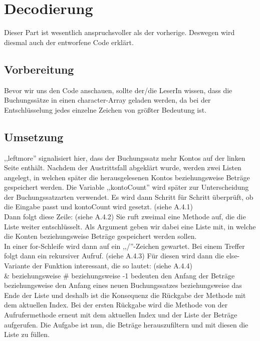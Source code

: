 \documentclass[12pt]{report}
\begin{document}
\chapter{Decodierung}
\lhead{\thepage}
Dieser Part ist wesentlich anspruchsvoller als der vorherige. Deswegen wird diesmal auch der entworfene Code erklärt.

\section{Vorbereitung}
Bevor wir uns den Code anschauen, sollte der/die LeserIn wissen, dass die Buchungssätze in einen character-Array geladen werden, da bei der Entschlüsselung jedes einzelne Zeichen von größter Bedeutung ist.

\section{Umsetzung}



\noindent ,,leftmore'' signalisiert hier, dass der Buchungssatz mehr Kontos auf der linken Seite enthält. Nachdem der Austrittsfall abgeklärt wurde, werden zwei Listen angelegt, in welchen später die herausgelesenen Kontos beziehungsweise Beträge gespeichert werden. Die Variable ,,kontoCount'' wird später zur Unterscheidung der Buchungssatzarten verwendet. Es wird dann Schritt für Schritt überprüft, ob die Eingabe passt und kontoCount wird gesetzt. (siehe A.4.1)\\



\noindent Dann folgt diese Zeile: (siehe A.4.2) Sie ruft zweimal eine Methode auf, die die Liste weiter entschlüsselt. Als Argument geben wir dabei eine Liste mit, in welche die Konten beziehungsweise Beträge gespeichert werden sollen.\\


\noindent In einer for-Schleife wird dann auf ein ,,/''-Zeichen gewartet. Bei einem Treffer folgt dann ein rekursiver Aufruf. (siehe A.4.3)  Für diesen wird dann die else-Variante der Funktion interessant, die so lautet: (siehe A.4.4)\\


\noindent \& beziehungsweise \# beziehungsweise -1 bedeuten den Anfang der Beträge beziehungsweise den Anfang eines neuen Buchungssatzes beziehungsweise das Ende der Liste und deshalb ist die Konsequenz die Rückgabe der Methode mit dem aktuellen Index. Bei der ersten Rückgabe wird die Methode von der Aufrufermethode erneut mit dem aktuellen Index und der Liste der Beträge aufgerufen. Die Aufgabe ist nun, die Beträge herauszufiltern und mit diesen die Liste zu füllen.\\
\end{document}
